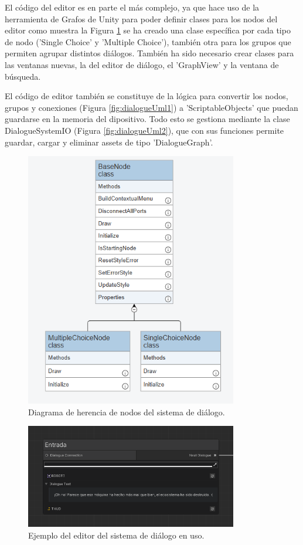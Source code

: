 El código del editor es en parte el más complejo, ya que hace uso de la herramienta de Grafos de Unity para poder definir clases para los nodos del editor como muestra la 
Figura \ref{fig:nodos} se ha creado una clase específica por cada tipo de nodo ('Single Choice' y 'Multiple Choice'), también otra para los grupos que permiten agrupar distintos 
diálogos. También ha sido necesario crear clases para las ventanas nuevas, la del editor de diálogo, el 'GraphView' y la ventana de búsqueda.

El código de editor también se constituye de la lógica para convertir los nodos, grupos y conexiones (Figura \ref{fig:dialogueUml1}) a 'ScriptableObjects' que puedan guardarse en la memoria del dipositivo. Todo esto se gestiona mediante la clase
DialogueSystemIO (Figura \ref{fig:dialogueUml2}), que con sus funciones permite guardar, cargar y eliminar assets de tipo 'DialogueGraph'.  

\begin{figure}[H]
  \centering
    \includegraphics[width=350px,clip=true]{Node_Herencia.png}
  \caption{Diagrama de herencia de nodos del sistema de diálogo.}
  \label{fig:nodos}
\end{figure}

\begin{figure}[H]
  \centering
    \includegraphics[width=350px,clip=true]{dialogue.png}
  \caption{Ejemplo del editor del sistema de diálogo en uso.}
  \label{fig:dialogueEditorExample}
\end{figure}

